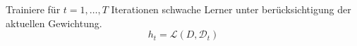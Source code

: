Trainiere für $t=1,\dots,T$ Iterationen schwache Lerner unter berücksichtigung der aktuellen Gewichtung.
$$
    h_t = \mathcal{L}(D, \mathcal{D}_t)
$$